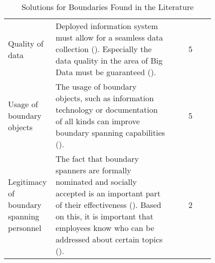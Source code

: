 \begin{table}[htbp]
\begin{tabular}{L{0.238\linewidth}L{0.58\linewidth}c}
    Quality of data                                            & Deployed information system must allow for a seamless data collection (\cite{Lukyanenko.2019}). Especially the data quality in the area of Big Data must be guaranteed (\cite{Wook.2021}).                                                                                                                                                                                                                                                                                                                    & 5  \\
    Usage of boundary objects                                  & The usage of boundary objects, such as information technology or documentation of all kinds can improve boundary spanning capabilities (\cite{Pawlowski.2004}).                                                                                                                                                                                                                                                                                                                                               & 5  \\ 
    Legitimacy of boundary spanning personnel                  & The fact that boundary spanners are formally nominated and socially accepted is an important part of their effectiveness (\cite{Levina.2005}). Based on this, it is important that employees know who can be addressed about certain topics (\cite{Mell.2022}).                                                                                                                                                                                                                                                   & 2  \\ \hline
    \end{tabular}
    \caption{Solutions for Boundaries Found in the Literature}
    \label{resolveBoundary}
\end{table}

